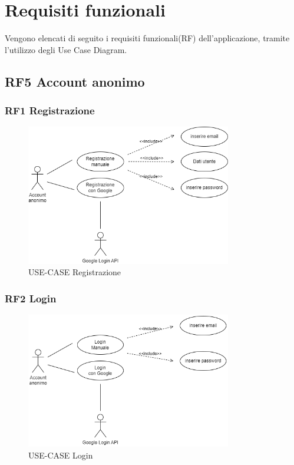 \documentclass[a4paper,12pt]{article}
\begin{document}
\newpage

\section{Requisiti funzionali}

Vengono elencati di seguito i requisiti funzionali(RF) dell'applicazione, tramite l'utilizzo degli Use Case Diagram.

\subsection*{RF5 Account anonimo}

\subsubsection*{RF1 Registrazione}
\begin{figure}[H]
   \centering
    \includegraphics[width=0.8\textwidth]{img-D2/registrazione_anonimo.png}
    \caption{USE-CASE Registrazione}
\end{figure}


\subsubsection*{RF2 Login}
\begin{figure}[H]
   \centering
   \includegraphics[width=0.8\textwidth]{img-D2/login_anonimo.png}
    \caption{USE-CASE Login}
\end{figure}
\end{document}
